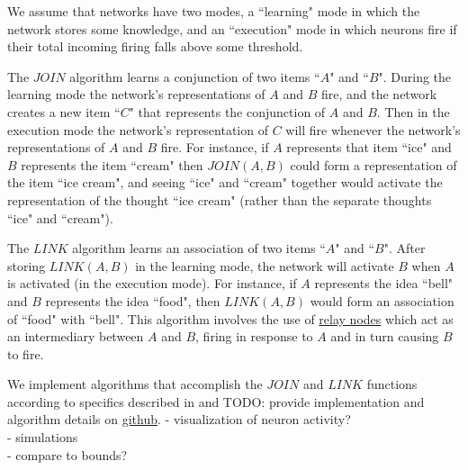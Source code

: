 \documentclass[letterpaper, 12pt]{article}
\begin{document}
We assume that networks have two modes, a ``learning" mode in which the network stores some knowledge, and an ``execution" mode in which neurons fire if their total incoming firing falls above some threshold. 

The $JOIN$ algorithm learns a conjunction of two items ``$A$" and ``$B$". During the learning mode the network's representations of $A$ and $B$ fire, and the network creates a new item ``$C$" that represents the conjunction of $A$ and $B$. Then in the execution mode the network's representation of $C$ will fire whenever the network's representations of $A$ and $B$ fire. For instance, if $A$ represents that item ``ice" and $B$ represents the item ``cream" then $JOIN(A,B)$ could form a representation of the item ``ice cream", and seeing ``ice" and ``cream" together would activate the representation of the thought ``ice cream" (rather than the separate thoughts ``ice" and ``cream").

The $LINK$ algorithm learns an association of two items ``$A$" and ``$B$". After storing $LINK(A,B)$ in the learning mode, the network will activate $B$ when $A$ is activated (in the execution mode). For instance, if $A$ represents the idea ``bell" and $B$ represents the idea ``food", then $LINK(A,B)$ would form an association of ``food" with ``bell". This algorithm involves the use of \underline{relay nodes} which act as an intermediary between $A$ and $B$, firing in response to $A$ and in turn causing $B$ to fire.

We implement algorithms that accomplish the $JOIN$ and $LINK$ functions according to specifics described in \cite{valiant_memorization_2005} and TODO: provide implementation and algorithm details on \href{https://github.com/cchen23/neuroidal_model_project/tree/master/Code}{github}.
- visualization of neuron activity?\\
- simulations\\
- compare to bounds?\\
\end{document}
